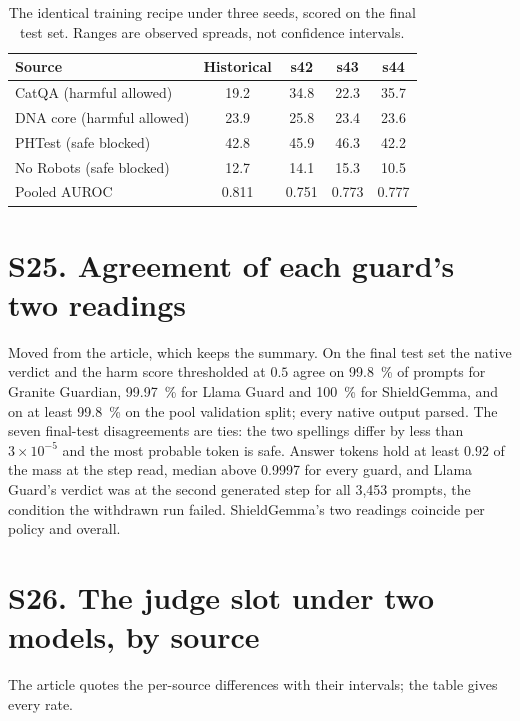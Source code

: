 \begin{table}[!htbp]
\caption{The identical training recipe under three seeds, scored on the final
test set. Ranges are observed spreads, not confidence intervals.}
\label{tab:seeds}
\centering
\scriptsize
\begin{tabular}{@{}lcccc@{}}
\toprule
Source & Historical & s42 & s43 & s44 \\
\midrule
CatQA (harmful allowed)     & 19.2 & 34.8 & 22.3 & 35.7 \\
DNA core (harmful allowed)  & 23.9 & 25.8 & 23.4 & 23.6 \\
PHTest (safe blocked)       & 42.8 & 45.9 & 46.3 & 42.2 \\
No Robots (safe blocked)    & 12.7 & 14.1 & 15.3 & 10.5 \\
\midrule
Pooled AUROC                & 0.811 & 0.751 & 0.773 & 0.777 \\
\bottomrule
\end{tabular}
\end{table}

\section*{S25. Agreement of each guard's two readings}

Moved from the article, which keeps the summary. On the final test set the native verdict and the harm score thresholded at
$0.5$ agree on
\SI{99.8}{\percent} of prompts for Granite Guardian, \SI{99.97}{\percent} for
Llama Guard and \SI{100}{\percent} for ShieldGemma, and on at least
\SI{99.8}{\percent} on the pool validation split; every native output parsed.
The seven final-test disagreements are ties: the two spellings differ by less
than $3\times10^{-5}$ and the most probable token is safe. Answer tokens hold
at least \num{0.92} of the mass at the step read, median above \num{0.9997} for every guard, and Llama Guard's verdict was
at the second generated step for all 3{,}453 prompts, the condition the
withdrawn run failed. ShieldGemma's two readings coincide per policy and overall.

\section*{S26. The judge slot under two models, by source}

The article quotes the per-source differences with their intervals; the table gives every rate.


